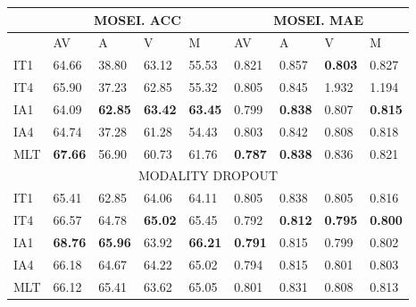 \documentclass[a4paper,conference]{IEEEtran}
\begin{document}
\begin{table}[]
\scriptsize
\centering
\begin{tabular}{|l|p{13pt}p{13pt}p{13pt}p{13pt}|p{13pt}p{13pt}p{13pt}p{13pt}|}
\hline
       & \multicolumn{4}{c|}{MOSEI. ACC}                                    & \multicolumn{4}{|c|}{MOSEI. MAE}                                    \\
       \hline
       & AV             & A              & V              & M              & AV             & A              & V              & M              \\
IT1    & 64.66          & 38.80          & 63.12          & 55.53          & 0.821          & 0.857          & \textbf{0.803} & 0.827          \\
IT4    & 65.90          & 37.23          & 62.85          & 55.32          & 0.805          & 0.845          & 1.932          & 1.194          \\
IA1    & 64.09          & \textbf{62.85} & \textbf{63.42} & \textbf{63.45} & 0.799          & \textbf{0.838} & 0.807          & \textbf{0.815} \\
IA4    & 64.74          & 37.28          & 61.28          & 54.43          & 0.803          & 0.842          & 0.808          & 0.818          \\
MLT   & \textbf{67.66} & 56.90          & 60.73          & 61.76          & \textbf{0.787} & \textbf{0.838} & 0.836          & 0.821          \\
\hline
\multicolumn{9}{c}{MODALITY DROPOUT}                                                                    \\
\hline
IT1  & 65.41          & 62.85          & 64.06          & 64.11          & 0.805          & 0.838          & 0.805          & 0.816          \\
IT4  & 66.57          & 64.78          & \textbf{65.02} & 65.45          & 0.792          & \textbf{0.812} & \textbf{0.795} & \textbf{0.800} \\
IA1  & \textbf{68.76} & \textbf{65.96} & 63.92          & \textbf{66.21} & \textbf{0.791} & 0.815          & 0.799          & 0.802          \\
IA4  & 66.18          & 64.67          & 64.22          & 65.02          & 0.794          & 0.815          & 0.801          & 0.803          \\
MLT   & 66.12          & 65.41          & 63.62          & 65.05          & 0.801          & 0.831          & 0.808          & 0.813          \\

\end{tabular}
\end{table}
\end{document}
